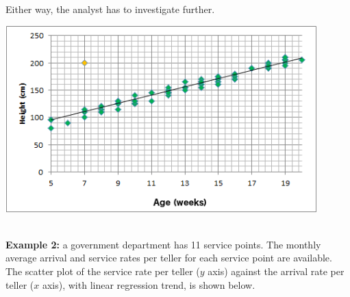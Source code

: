 \documentclass[20pt,landscape,footrule,headrule]{foils}
\newcommand{\newl}{\newline\newline}
\begin{document}
Either way, the analyst has to investigate further.
\newpage\ 
\begin{center}\includegraphics[width=0.90\textwidth]{Images/plant_height_vs_age_EN}\end{center} 
\newpage\ \\ \noindent \textbf{Example 2:} 
a government department has 11 service points. The monthly average arrival and service rates per teller for each service point are available. \newl The scatter plot of the service rate per teller ($y$ axis) against the arrival rate per teller ($x$ axis), with linear regression trend, is shown below. 
\end{document}
